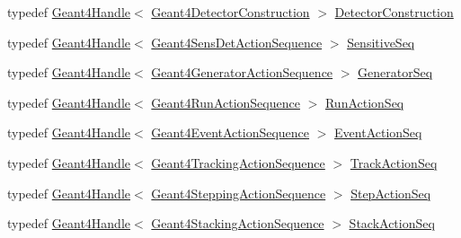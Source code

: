 \begin{DoxyCompactItemize}
\item 
typedef \hyperlink{class_d_d4hep_1_1_simulation_1_1_geant4_handle}{Geant4\+Handle}$<$ \hyperlink{class_d_d4hep_1_1_simulation_1_1_geant4_detector_construction}{Geant4\+Detector\+Construction} $>$ \hyperlink{namespace_d_d4hep_1_1_simulation_1_1_setup_a8405db8ef232c0fb524d029682e94005}{Detector\+Construction}
\item 
typedef \hyperlink{class_d_d4hep_1_1_simulation_1_1_geant4_handle}{Geant4\+Handle}$<$ \hyperlink{class_d_d4hep_1_1_simulation_1_1_geant4_sens_det_action_sequence}{Geant4\+Sens\+Det\+Action\+Sequence} $>$ \hyperlink{namespace_d_d4hep_1_1_simulation_1_1_setup_a92085f8dfd1adaa9d05d5aeeeb9380b2}{Sensitive\+Seq}
\item 
typedef \hyperlink{class_d_d4hep_1_1_simulation_1_1_geant4_handle}{Geant4\+Handle}$<$ \hyperlink{class_d_d4hep_1_1_simulation_1_1_geant4_generator_action_sequence}{Geant4\+Generator\+Action\+Sequence} $>$ \hyperlink{namespace_d_d4hep_1_1_simulation_1_1_setup_aeb672344cb12e47b674a3ca15d4eddad}{Generator\+Seq}
\item 
typedef \hyperlink{class_d_d4hep_1_1_simulation_1_1_geant4_handle}{Geant4\+Handle}$<$ \hyperlink{class_d_d4hep_1_1_simulation_1_1_geant4_run_action_sequence}{Geant4\+Run\+Action\+Sequence} $>$ \hyperlink{namespace_d_d4hep_1_1_simulation_1_1_setup_ab53cac92250bbb067944b1393760ec72}{Run\+Action\+Seq}
\item 
typedef \hyperlink{class_d_d4hep_1_1_simulation_1_1_geant4_handle}{Geant4\+Handle}$<$ \hyperlink{class_d_d4hep_1_1_simulation_1_1_geant4_event_action_sequence}{Geant4\+Event\+Action\+Sequence} $>$ \hyperlink{namespace_d_d4hep_1_1_simulation_1_1_setup_a4be5336a4ddd9dee751fc71c1f391c38}{Event\+Action\+Seq}
\item 
typedef \hyperlink{class_d_d4hep_1_1_simulation_1_1_geant4_handle}{Geant4\+Handle}$<$ \hyperlink{class_d_d4hep_1_1_simulation_1_1_geant4_tracking_action_sequence}{Geant4\+Tracking\+Action\+Sequence} $>$ \hyperlink{namespace_d_d4hep_1_1_simulation_1_1_setup_a5266c2f851adc926f84380c385c8dca4}{Track\+Action\+Seq}
\item 
typedef \hyperlink{class_d_d4hep_1_1_simulation_1_1_geant4_handle}{Geant4\+Handle}$<$ \hyperlink{class_d_d4hep_1_1_simulation_1_1_geant4_stepping_action_sequence}{Geant4\+Stepping\+Action\+Sequence} $>$ \hyperlink{namespace_d_d4hep_1_1_simulation_1_1_setup_ab53ef7047293eb31171e955f62418eaf}{Step\+Action\+Seq}
\item 
typedef \hyperlink{class_d_d4hep_1_1_simulation_1_1_geant4_handle}{Geant4\+Handle}$<$ \hyperlink{class_d_d4hep_1_1_simulation_1_1_geant4_stacking_action_sequence}{Geant4\+Stacking\+Action\+Sequence} $>$ \hyperlink{namespace_d_d4hep_1_1_simulation_1_1_setup_a4b1936ec223ba4447955c468db61490f}{Stack\+Action\+Seq}

\end{DoxyCompactItemize}
